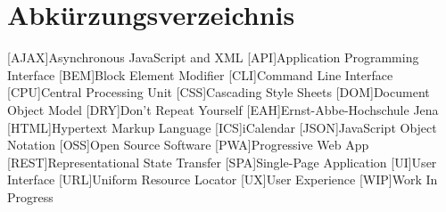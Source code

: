 \section*{Abkürzungsverzeichnis}
\begin{acronym}[xxxxxxx]\itemsep0pt
    [AJAX]{Asynchronous JavaScript and XML}
    [API]{Application Programming Interface}
    [BEM]{Block Element Modifier}
    [CLI]{Command Line Interface}
    [CPU]{Central Processing Unit}
    [CSS]{Cascading Style Sheets}
    [DOM]{Document Object Model}
    [DRY]{Don’t Repeat Yourself}
    [EAH]{Ernst-Abbe-Hochschule Jena}
    [HTML]{Hypertext Markup Language}
    [ICS]{iCalendar}
    [JSON]{JavaScript Object Notation}
    [OSS]{Open Source Software}
    [PWA]{Progressive Web App}
    [REST]{Representational State Transfer}
    [SPA]{Single-Page Application}
    [UI]{User Interface}
    [URL]{Uniform Resource Locator}
    [UX]{User Experience}
    [WIP]{Work In Progress}
\end{acronym}
